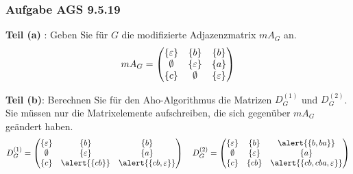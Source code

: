 \documentclass{beamer}
\begin{document}
\begin{frame} \frametitle{Aufgabe AGS 9.5.19}
	\footnotesize
	\begin{minipage}{\dimexpr0.5\linewidth-\fboxrule-\fboxsep}
		\begin{center}
		\end{center}
	\end{minipage} 
	\pause
	\begin{minipage}{\dimexpr0.5\linewidth-\fboxrule-\fboxsep}
		\textbf{Teil (a)} : 
		Geben Sie für $G$ die modifizierte Adjazenzmatrix $mA_G$ an. \pause
		\begin{equation*}
		mA_G = \begin{pmatrix}
		\left\{ \varepsilon \right\} & \left\{ b \right\} & \left\{ b \right\} \\
		\emptyset & \left\{ \varepsilon \right\} & \left\{ a \right\} \\
		\left\{ c \right\} & \emptyset & \left\{ \varepsilon \right\}
		\end{pmatrix}
		\end{equation*}
	\end{minipage}
	\pause
	\vspace{2em}
	
	\textbf{Teil (b)}: Berechnen Sie für den Aho-Algorithmus die Matrizen $D_G^{(1)}$ und $D_G^{(2)}$. Sie müssen nur die Matrixelemente aufschreiben, die sich gegenüber $mA_G$ geändert haben. \pause
	\begin{equation*}
	D_G^{(1)} = 
	\begin{pmatrix}
	\menge{\epsilon} & \menge{b} & \menge{b} \\
	\emptyset & \menge{\epsilon} & \menge{a} \\
	\menge{c} & \alert{\menge{cb}} & \alert{\menge{cb,\epsilon}}
	\end{pmatrix} 
	\quad 
	D_G^{(2)} = 
	\begin{pmatrix}
	\menge{\epsilon} & \menge{b} & \alert{\menge{b, ba}} \\
	\emptyset & \menge{\epsilon} & \menge{a} \\
	\menge{c} & \menge{cb} & \alert{\menge{cb, cba, \epsilon}}
	\end{pmatrix} 
	\end{equation*}
\end{frame}
\end{document}
